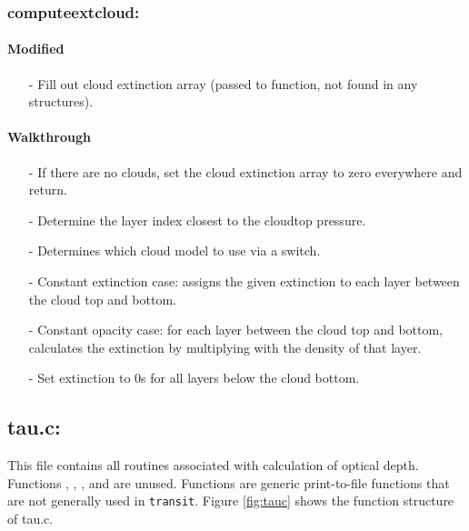 \documentclass[letterpaper,12pt]{article}
\begin{document}
\subsubsection{computeextcloud:}
\paragraph{Modified}
\begin{enumerate}[leftmargin=10pt, noitemsep, parsep=0pt, topsep=0ex]
\item[-] Fill out cloud extinction array (passed to function, not found in any structures).
\end{enumerate}

\paragraph{Walkthrough}
\begin{enumerate}[leftmargin=10pt, noitemsep, parsep=0pt, topsep=0ex]
\item[-] If there are no clouds, set the cloud extinction array to zero everywhere and return.
\item[-] Determine the layer index closest to the cloudtop pressure.
\item[-] Determines which cloud model to use via a switch.
\item[-] Constant extinction case: assigns the given extinction to each layer between the cloud top and bottom.
\item[-] Constant opacity case: for each layer between the cloud top and bottom, calculates the extinction by multiplying with the density of that layer.
\item[-] Set extinction to 0s for all layers below the cloud bottom.
\end{enumerate}

\newpage
\subsection{tau.c:}
This file contains all routines associated with calculation of optical depth. Functions , , , and  are unused. Functions  are generic print-to-file functions that are not generally used in {\tt transit}. Figure \ref{fig:tauc} shows the function structure of tau.c.
\end{document}
